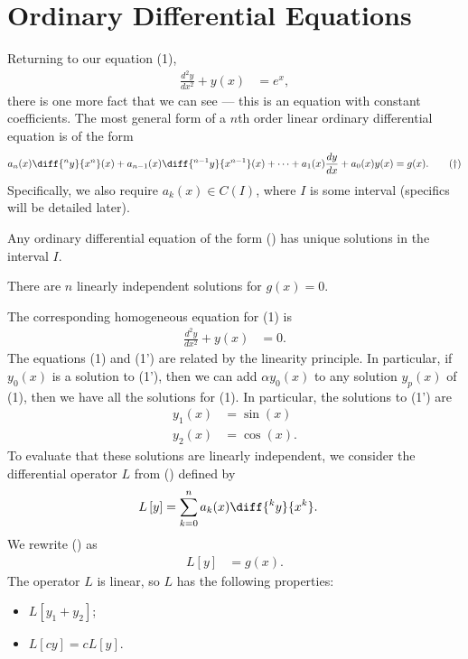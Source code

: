 \documentclass[10pt]{mypackage}
\begin{document}
\section{Ordinary Differential Equations}%
Returning to our equation (1), 
\begin{align*}
  \frac{d^2y}{dx^2} + y(x) &= e^x,\tag*{(1)}
\end{align*}
there is one more fact that we can see --- this is an equation with constant coefficients. The most general form of a $n$th order linear ordinary differential equation is of the form
\begin{align*}
  a_n(x)\diff{^ny}{x^n}(x) + a_{n-1}(x)\diff{^{n-1}y}{x^{n-1}}(x) + \cdots + a_1(x)\frac{dy}{dx} + a_0(x)y(x) = g(x).\label{eq:general_linear_ode}\tag{\textdagger}
\end{align*}
Specifically, we also require $a_k(x)\in C(I)$, where $I$ is some interval (specifics will be detailed later).
\begin{theorem}
  Any ordinary differential equation of the form (\textdagger) has unique solutions in the interval $I$.\newline

  There are $n$ linearly independent solutions for $g(x) = 0$.
\end{theorem}
The corresponding homogeneous equation for (1) is
\begin{align*}
  \frac{d^2y}{dx^2} + y(x) &= 0.\tag*{(1')}
\end{align*}
The equations (1) and (1') are related by the linearity principle. In particular, if $y_0(x)$ is a solution to (1'), then we can add $\alpha y_0(x)$ to any solution $y_p(x)$ of (1), then we have all the solutions for (1). In particular, the solutions to (1') are
\begin{align*}
  y_1(x) &= \sin(x)\\
  y_2(x) &= \cos(x).
\end{align*}
To evaluate that these solutions are linearly independent, we consider the differential operator $L$ from (\textdagger) defined by
\begin{align*}
  L\left[y\right] &= \sum_{k=0}^{n}a_k(x)\diff{^{k}y}{x^{k}}.
\end{align*}
We rewrite (\textdagger) as
\begin{align*}
  L\left[y\right] &= g(x).
\end{align*}
The operator $L$ is linear, so $L$ has the following properties:
\begin{itemize}
  \item $L\left[y_1 + y_2\right]$;
  \item $L\left[cy\right] = cL\left[y\right]$.
\end{itemize}
\end{document}
